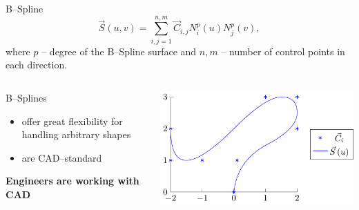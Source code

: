 \begin{frame}{B--Spline}
\begin{equation*}
\vec{S}\left(u,v\right)=\sum\limits_{i,j=1}^{n,m} \vec{C}_{i,j} N_i^p\left(u\right) N_j^p\left(v\right),
\end{equation*}
where $p$ -- degree of the B--Spline surface and $n,m$ -- number of control points in each direction.
\begin{columns}
\begin{column}{.45\textwidth}
B--Splines
\begin{itemize}
\item offer great flexibility for handling arbitrary shapes
\item are CAD--standard
\end{itemize}
\textbf{Engineers are working with CAD}
\end{column}
\begin{column}{.45\textwidth}
\includegraphics[width=\textwidth]{Pictures/BSplineEx/example.pdf}
\end{column}
\end{columns}
\end{frame}

